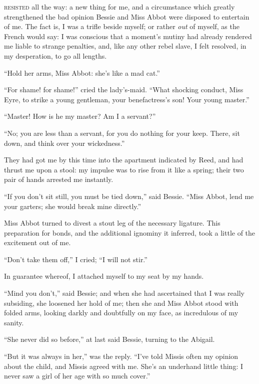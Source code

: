 
 \textsc{resisted} all the way: a new thing for me, and a circumstance which
greatly strengthened the bad opinion Bessie and Miss Abbot were disposed
to entertain of me.  The fact is, I was a trifle beside myself; or
rather \emph{out} of myself, as the French would say: I was conscious
that a moment's mutiny had already rendered me liable to strange
penalties, and, like any other rebel slave, I felt resolved, in my
desperation, to go all lengths.

\enquote{Hold her arms, Miss Abbot: she's like a mad cat.}

\enquote{For shame! for shame!} cried the lady's-maid.  \enquote{What
	shocking conduct, Miss Eyre, to strike a young gentleman, your
	benefactress's son!  Your young master.}

\enquote{Master!  How is he my master?  Am I a servant?}

\enquote{No; you are less than a servant, for you do nothing for your
	keep.  There, sit down, and think over your wickedness.}

They had got me by this time into the apartment indicated by \Mrs{} Reed,
and had thrust me upon a stool: my impulse was to rise from it like a
spring; their two pair of hands arrested me instantly.

\enquote{If you don't sit still, you must be tied down,} said Bessie.
\enquote{Miss Abbot, lend me your garters; she would break mine
	directly.}

Miss Abbot turned to divest a stout leg of the necessary ligature.  This
preparation for bonds, and the additional ignominy it inferred, took a
little of the excitement out of me.

\enquote{Don't take them off,} I cried; \enquote{I will not stir.}

In guarantee whereof, I attached myself to my seat by my hands.

\enquote{Mind you don't,} said Bessie; and when she had ascertained that
I was really subsiding, she loosened her hold of me; then she and Miss
Abbot stood with folded arms, looking darkly and doubtfully on my face,
as incredulous of my sanity.

\enquote{She never did so before,} at last said Bessie, turning to the
Abigail.

\enquote{But it was always in her,} was the reply.  \enquote{I've told
	Missis often my opinion about the child, and Missis agreed with me.
	She's an underhand little thing: I never saw a girl of her age with so
	much cover.}

